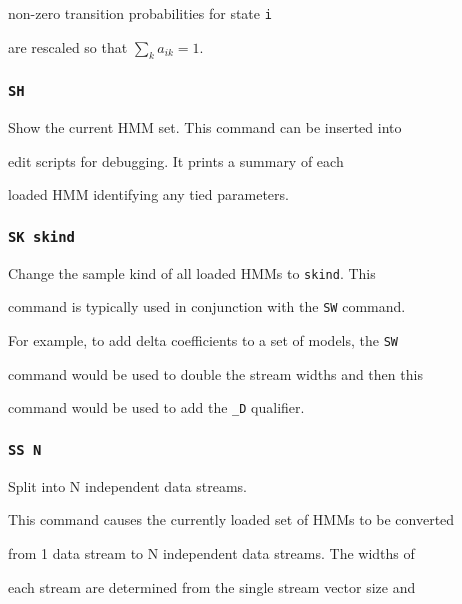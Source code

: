 non-zero transition probabilities for  state \texttt{i} 


are rescaled so that $\sum_k a_{ik} = 1 $.





\subsubsection*{\tt SH}





Show the current HMM set.  This command can be inserted into


edit scripts for debugging.  It prints a summary of each


loaded HMM identifying any tied parameters.





\subsubsection*{\tt SK skind}





Change the sample kind of all loaded HMMs to \texttt{skind}.  This


command is typically used in conjunction with the \texttt{SW} command.


For example, to add delta coefficients to a set of models, the \texttt{SW}


command would be used to double the stream widths and then this


command would be used to add the \texttt{\_D} qualifier.





\subsubsection*{\tt SS N}





Split into N independent data streams.


This command causes the currently loaded set of HMMs to be converted


from 1 data stream to N independent data streams.  The widths of 


each stream are determined from the single stream vector size and


